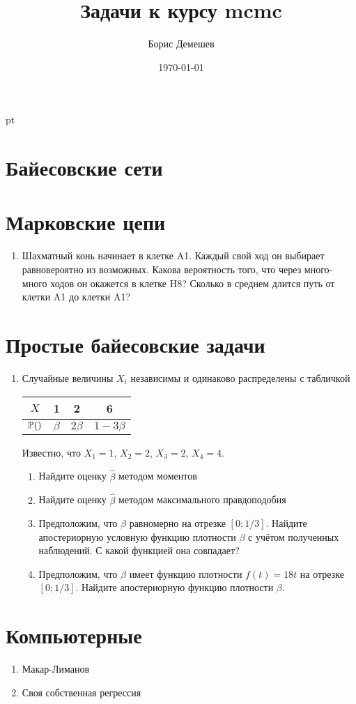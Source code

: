 \documentclass[pdftex,12pt,a4paper]{article}
\title{Задачи к курсу mcmc}
\author{Борис Демешев}
\date{\today}
\newcommand{\solution}[1]{}
\begin{document}
 pt %

\section{Байесовские сети}


\section{Марковские цепи}
\begin{enumerate}
\item Шахматный конь начинает в клетке A1. Каждый свой ход он выбирает равновероятно из возможных. Какова вероятность того, что через много-много ходов он окажется в клетке H8? Сколько в среднем длится путь от клетки A1 до клетки A1?
\end{enumerate}
\solution{}

\section{Простые байесовские задачи}
\begin{enumerate}
\item Случайные величины $X_i$ независимы и одинаково распределены с табличкой

\begin{tabular}{c|ccc}
$X$ & 1 & 2 & 6 \\ 
\hline 
$\P()$ & $\beta$ & $2\beta$ & $1-3\beta$ \\ 
\end{tabular} 

Известно, что $X_1=1$, $X_2=2$, $X_3=2$, $X_4=4$. 
\begin{enumerate}
\item Найдите оценку $\hat{\beta}$ методом моментов
\item Найдите оценку $\hat{\beta}$ методом максимального правдоподобия
\item Предположим, что $\beta$ равномерно на отрезке $[0;1/3]$. Найдите апостериорную условную функцию плотности $\beta$ с учётом полученных наблюдений. С какой функцией она совпадает?
\item Предположим, что $\beta$ имеет функцию плотности $f(t)=18t$ на отрезке $[0;1/3]$. Найдите апостериорную функцию плотности $\beta$. 
\end{enumerate}



\end{enumerate}

\section{Компьютерные}

\begin{enumerate}
\item Макар-Лиманов
\item Своя собственная регрессия 
\end{enumerate}
\end{document}
